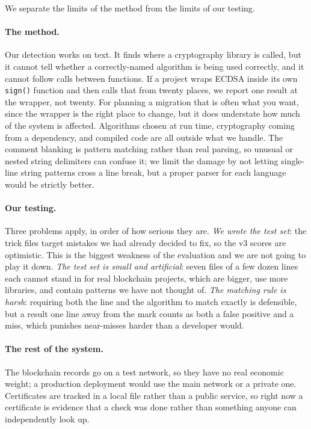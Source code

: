 \documentclass[runningheads]{llncs}
\begin{document}
We separate the limits of the method from the limits of our testing.

\paragraph{The method.} Our detection works on text. It finds where a
cryptography library is called, but it cannot tell whether a correctly-named
algorithm is being used correctly, and it cannot follow calls between functions.
If a project wraps ECDSA inside its own \texttt{sign()} function and then calls
that from twenty places, we report one result at the wrapper, not twenty. For
planning a migration that is often what you want, since the wrapper is the right
place to change, but it does understate how much of the system is affected.
Algorithms chosen at run time, cryptography coming from a dependency, and
compiled code are all outside what we handle. The comment blanking is pattern
matching rather than real parsing, so unusual or nested string delimiters can
confuse it; we limit the damage by not letting single-line string patterns cross
a line break, but a proper parser for each language would be strictly better.

\paragraph{Our testing.} Three problems apply, in order of how serious they are.
\emph{We wrote the test set}: the trick files target mistakes we had already
decided to fix, so the v3 scores are optimistic. This is the biggest weakness of
the evaluation and we are not going to play it down. \emph{The test set is small
and artificial}: seven files of a few dozen lines each cannot stand in for real
blockchain projects, which are bigger, use more libraries, and contain patterns
we have not thought of. \emph{The matching rule is harsh}: requiring both the
line and the algorithm to match exactly is defensible, but a result one line
away from the mark counts as both a false positive and a miss, which punishes
near-misses harder than a developer would.

\paragraph{The rest of the system.} The blockchain records go on a test network,
so they have no real economic weight; a production deployment would use the main
network or a private one. Certificates are tracked in a local file rather than a
public service, so right now a certificate is evidence that a check was done
rather than something anyone can independently look up.
\end{document}
